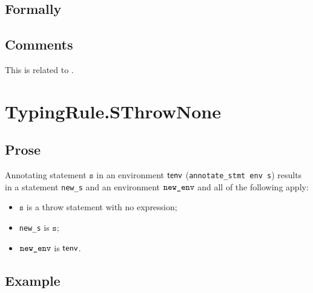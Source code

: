 \documentclass{book}
\newcommand\annotaterel[0]{\hyperlink{def-annotaterel}{\textsf{type}}}
\newcommand\typearrow[0]{\xrightarrow{\annotaterel}}
\newcommand\annotateexpr[1]{\hyperlink{def-annotateexpr}{\texttt{annotate\_expr}(#1)}}
\newcommand\annotatestmt[1]{\texttt{annotate\_stmt}(#1)}
\newcommand\newtenv[0]{\texttt{new\_tenv}}
\newcommand\veone[0]{\texttt{e1}}
\newcommand\vetwo[0]{\texttt{e2}}
\newcommand\vs[0]{\texttt{s}}
\newcommand\news[0]{\texttt{new\_s}}
\newcommand\dir[0]{\texttt{dir}}
\begin{document}
\begin{emptyformal}
    \subsection{Formally}
\end{emptyformal}

\subsection{Comments}
    This is related to .


\section{TypingRule.SThrowNone \label{sec:TypingRule.SThrowNone}}

  \subsection{Prose}
Annotating statement $\vs$ in an environment $\textsf{tenv}$
(\texttt{annotate\_stmt env s}) results in a statement \texttt{new\_s} and an
environment $\texttt{new\_env}$ and all of the following apply:
   \begin{itemize}
   \item $\vs$ is a throw statement with no expression;
   \item \texttt{new\_s} is $\vs$;
   \item $\texttt{new\_env}$ is $\textsf{tenv}$.
   \end{itemize}

  \subsection{Example}


\end{document}
